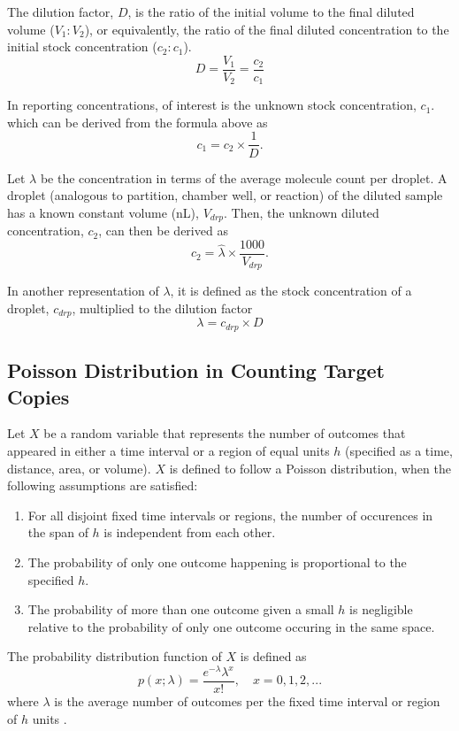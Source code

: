 The dilution factor, \(D\), is the ratio of the initial volume to the final diluted volume (\(V_1 : V_2\)), or equivalently, the ratio of the final diluted concentration to the initial stock concentration (\(c_2 : c_1\)).
\[
    D = \frac{V_1}{V_2} = \frac{c_2}{c_1}
\]

In reporting concentrations, of interest is the unknown stock concentration, \(c_1\). which can be derived from the formula above as 
\[
    c_1 = c_2 \times \frac{1}{D}.
\]

Let \(\lambda\) be the concentration in terms of the average molecule count per droplet. A droplet (analogous to partition, chamber well, or reaction) of the diluted sample has a known constant volume (nL), \(V_{drp}\). Then, the unknown diluted concentration, \(c_2\), can then be derived as 
\[
    c_2 = \hat{\lambda} \times \frac{1000}{V_{drp}}.
\]

In another representation of \(\lambda\), it is defined as the stock concentration of a droplet, \(c_{drp}\), multiplied to the dilution factor \cite{Zhu2014}
\begin{equation}
    \lambda = c_{drp} \times D \label{eq:lambda_1}
\end{equation}

\subsection{Poisson Distribution in Counting Target Copies}
\label{sec:targetconc_ch3_poisson}
Let \(X\) be a random variable that represents the number of outcomes that appeared in either a time interval or a region of equal units \(h\) (specified as a time, distance, area, or volume).  \(X\) is defined to follow a Poisson distribution, when the following assumptions are satisfied:

\begin{enumerate}
    \item For all disjoint fixed time intervals or regions, the number of occurences in the span of \(h\) is independent from each other.
    \item The probability of only one outcome happening is proportional to the specified \(h\).
    \item The probability of more than one outcome given a small \(h\) is negligible relative to the probability of only one outcome occuring in the same space.
\end{enumerate}

The probability distribution function of \(X\) is defined as
\[
    p(x; \lambda) = \frac{e^{-\lambda}\lambda^{x}}{x!},\quad x = 0, 1, 2, ...
\]
where \(\lambda\) is the average number of outcomes per the fixed time interval or region of \(h\) units \cite{Walpole2011}.

